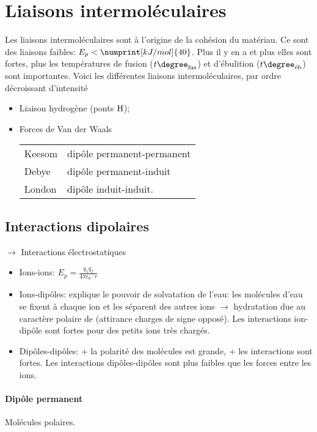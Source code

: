 \section{Liaisons intermoléculaires}
Les liaisons intermoléculaires sont à l'origine de la cohésion du matériau.
Ce sont des liaisons faibles: $E_p<\numprint[kJ/mol]{40}$.
Plus il y en a et plus elles sont fortes,
plus les températures de fusion ($t\degree_{\mathrm{fus}}$) et d'ébulition ($t\degree_{\textrm{éb}}$) sont importantes.
Voici les différentes liaisons intermoléculaires,
par ordre décroissant d'intensité
\begin{itemize}
  \item Liaison hydrogène (ponts $\ce{H}$);
  \item Forces de Van der Waals
    \begin{center}
      \begin{tabular}{ll}
        Keesom & dipôle permanent-permanent\\
        Debye & dipôle permanent-induit\\
        London & dipôle induit-induit.
      \end{tabular}
    \end{center}
\end{itemize}

\subsection{Interactions dipolaires}
$\rightarrow$ Interactions électrostatiques
\begin{itemize}
  \item Ions-ions: $E_p=\frac{q_1q_2}{4\pi\epsilon_0\cdot r}$
  \item Ions-dipôles: explique le pouvoir de solvatation de l'eau: les molécules d'eau se fixent à chaque ion et les séparent des autres ions $\rightarrow$ hydratation due au caractère polaire de  (attirance charges de signe opposé).
    Les interactions ion-dipôle sont fortes pour des petits ions très chargés.
  \item Dipôles-dipôles: + la polarité des molécules est grande,
    + les interactions sont fortes.
    Les interactions dipôles-dipôles sont plus faibles que les forces entre les ions.
\end{itemize}

\paragraph{Dipôle permanent}
Molécules polaires.

